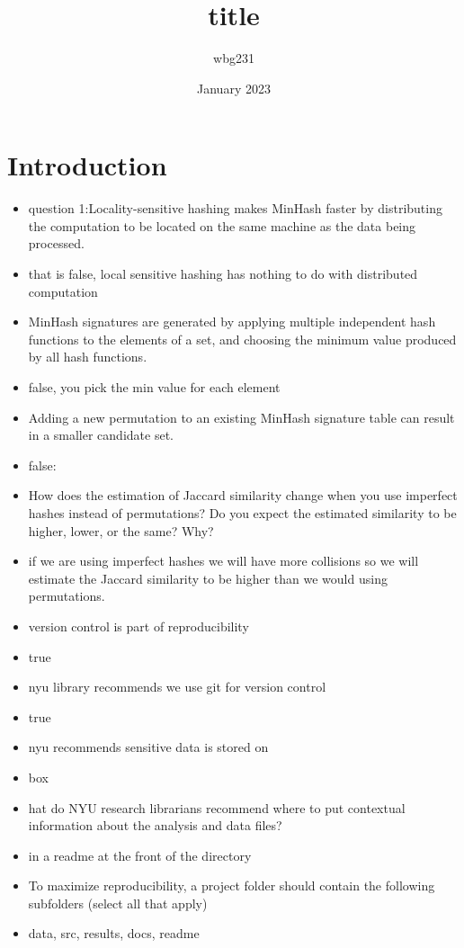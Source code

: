 \documentclass{article}
\title{title }
\author{wbg231 }
\date{January 2023}
\begin{document}
\maketitle

\section{Introduction}
\begin{itemize}
\item question 1:Locality-sensitive hashing makes MinHash faster by distributing the computation to be located on the same machine as the data being processed.
\item that is false, local sensitive hashing has nothing to do with distributed computation
\item MinHash signatures are generated by applying multiple independent hash functions to the elements of a set, and choosing the minimum value produced by all hash functions.
\item false, you pick the min value for each element
\item 
Adding a new permutation to an existing MinHash signature table can result in a smaller candidate set.
\item false: 
\item How does the estimation of Jaccard similarity change when you use imperfect hashes instead of permutations?  Do you expect the estimated similarity to be higher, lower, or the same?  Why?
\item if we are using imperfect hashes we will have more collisions so we will estimate the Jaccard similarity to be higher than we would using permutations.
\item version control is part of reproducibility
\item true 
\item nyu library recommends we use git for version control
\item true
\item nyu recommends sensitive data is stored on 
\item box
\item hat do NYU research librarians recommend where to put contextual information about the analysis and data files?
\item in a readme at the front of the directory
\item 
To maximize reproducibility, a project folder should contain the following subfolders (select all that apply) 
\item data, src, results, docs, readme
\end{itemize}
\end{document}
